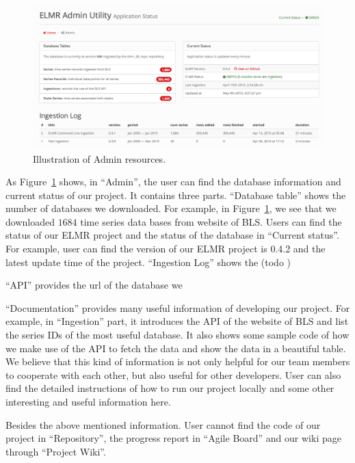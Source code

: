 \documentclass{sigchi}
\begin{document}
\begin{figure}
\centering
\includegraphics[scale = 0.5]{figures/Admin.png}
\caption{Illustration of Admin resources.}
\label{fig:admin}
\end{figure}
As Figure~\ref{fig:admin} shows, in ``Admin'', the user can find the database information and current status of our project. It contains three parts. ``Database table'' shows the number of databases we downloaded. For example,  in Figure~\ref{fig:admin}, we see that we downloaded $1684$ time series data bases from website of BLS\cite{Labor_data}. Users can find the status of our ELMR project and the status of the database in ``Current status''. For example, user can find the version of our ELMR project is 0.4.2 and the latest update time of the project. ``Ingestion Log'' shows the (todo )

``API'' provides the url of the database we

``Documentation'' provides many useful information of developing our project. For example, in ``Ingestion'' part, it introduces the API of the website of BLS and list the series IDs of the most useful database. It also shows some sample code of how we make use of the API to fetch the data and show the data in a beautiful table. We believe that this kind of information is not only helpful for our team members to cooperate with each other, but also useful for other developers. User can also find the detailed instructions of how to run our project locally and some other interesting and useful information here.

Besides the above mentioned information. User cannot find the code of our project in ``Repository'', the progress report in ``Agile Board'' and our wiki page through ``Project Wiki''.

\end{document}

